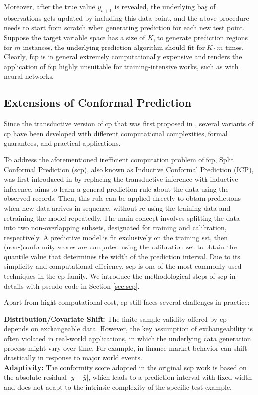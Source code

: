 Moreover, after the true value $y_{n+1}$ is revealed, the underlying bag of observations gets updated by including this data point, and the above procedure needs to start from scratch when generating prediction for each new test point. Suppose the target variable space has a size of $K$, to generate prediction regions for $m$ instances, the underlying prediction algorithm should fit for $K \cdot m$ times. Clearly, \gls{fcp} is in general extremely computationally expensive and renders the application of \gls{fcp} highly unsuitable for training-intensive works, such as with neural networks.

\subsection{Extensions of Conformal Prediction}
Since the transductive version of \gls{cp} that was first proposed in \cite{gammerman1998learning}, several variants of \gls{cp} have been developed with different computational complexities, formal guarantees, and practical applications.

To address the aforementioned inefficient computation problem of \gls{fcp}, Split Conformal Prediction (\gls{scp}), also known as Inductive Conformal Prediction (ICP), was first introduced in \cite{papadopoulos2002inductive} by replacing the transductive inference with inductive inference.  aims to learn a general prediction rule about the data using the observed records. Then, this rule can be applied directly to obtain predictions when new data arrives in sequence, without re-using the training data and retraining the model repeatedly. The main concept involves splitting the data into two non-overlapping subsets, designated for training and calibration, respectively. A predictive model is fit exclusively on the training set, then (non-)conformity scores are computed using the calibration set to obtain the quantile value that determines the width of the prediction interval. Due to its simplicity and computational efficiency, \gls{scp} is one of the most commonly used techniques in the \gls{cp} family. We introduce the methodological steps of \gls{scp} in details with pseudo-code in Section \ref{sec:scp}.

\vspace{0.5em} 	
Apart from hight computational cost, \gls{cp} still faces several challenges in practice: 
\vspace{0.2em} 

\noindent \textbf{Distribution/Covariate Shift:} The finite-sample validity offered by \gls{cp} depends on exchangeable data. However, the key assumption of exchangeability is often violated in real-world applications, in which the underlying data generation process might vary over time. For example, in finance market behavior can shift drastically in response to major world events. \\
 \noindent \textbf{Adaptivity:} The conformity score adopted in the original \gls{scp} work is based on the  absolute residual $|y - \hat{y}|$, which leads to a prediction interval with fixed width and does not adapt to the intrinsic complexity of the specific test example.
  
